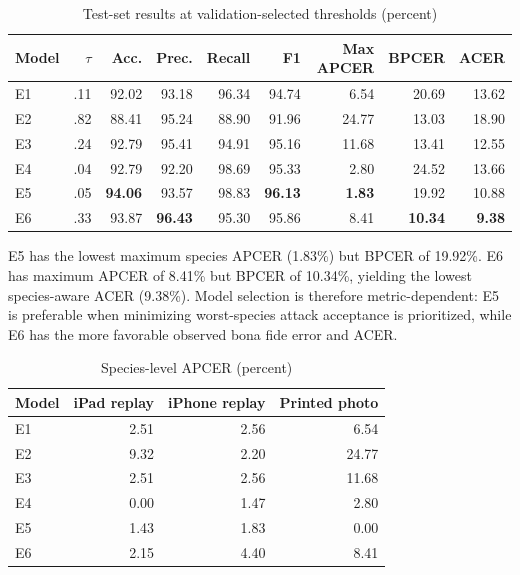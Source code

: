 \documentclass[a4paper,conference]{IEEEtran}
\begin{document}
\begin{table}[t]
\caption{Test-set results at validation-selected thresholds (percent)}\label{tab:results}\centering\footnotesize
\begin{tabular}{lrrrrrrrr}\toprule
Model & $\tau$ & Acc. & Prec. & Recall & F1 & Max APCER & BPCER & ACER\\\midrule
E1 & .11 & 92.02 & 93.18 & 96.34 & 94.74 & 6.54 & 20.69 & 13.62\\
E2 & .82 & 88.41 & 95.24 & 88.90 & 91.96 & 24.77 & 13.03 & 18.90\\
E3 & .24 & 92.79 & 95.41 & 94.91 & 95.16 & 11.68 & 13.41 & 12.55\\
E4 & .04 & 92.79 & 92.20 & 98.69 & 95.33 & 2.80 & 24.52 & 13.66\\
E5 & .05 & \textbf{94.06} & 93.57 & 98.83 & \textbf{96.13} & \textbf{1.83} & 19.92 & 10.88\\
E6 & .33 & 93.87 & \textbf{96.43} & 95.30 & 95.86 & 8.41 & \textbf{10.34} & \textbf{9.38}\\
\bottomrule\end{tabular}
\end{table}

E5 has the lowest maximum species APCER (1.83\%) but BPCER of 19.92\%. E6 has maximum APCER of 8.41\% but BPCER of 10.34\%, yielding the lowest species-aware ACER (9.38\%). Model selection is therefore metric-dependent: E5 is preferable when minimizing worst-species attack acceptance is prioritized, while E6 has the more favorable observed bona fide error and ACER.

\begin{table}[t]
\caption{Species-level APCER (percent)}\label{tab:species}\centering\footnotesize
\begin{tabular}{lrrr}\toprule
Model & iPad replay & iPhone replay & Printed photo\\\midrule
E1 & 2.51 & 2.56 & 6.54\\
E2 & 9.32 & 2.20 & 24.77\\
E3 & 2.51 & 2.56 & 11.68\\
E4 & 0.00 & 1.47 & 2.80\\
E5 & 1.43 & 1.83 & 0.00\\
E6 & 2.15 & 4.40 & 8.41\\
\bottomrule\end{tabular}
\end{table}
\end{document}

